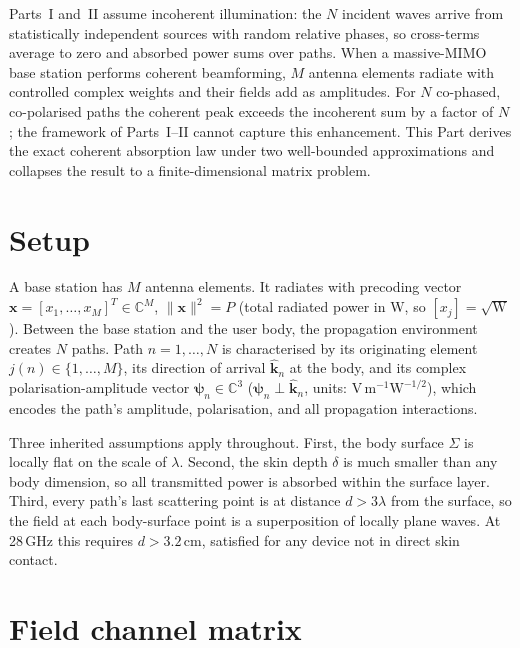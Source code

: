 \documentclass[11pt,a4paper]{article}
\theoremstyle{definition}      %
\begin{document}
Parts~I and~II assume incoherent illumination: the $N$ incident
waves arrive from statistically independent sources with random
relative phases, so cross-terms average to zero and absorbed power
sums over paths.  When a massive-MIMO base station performs coherent
beamforming, $M$ antenna elements radiate with controlled complex
weights and their fields add as amplitudes.  For $N$ co-phased,
co-polarised paths the coherent peak exceeds the incoherent sum by a
factor of $N$; the framework of Parts~I--II cannot capture this
enhancement.  This Part derives the exact coherent absorption law
under two well-bounded approximations and collapses the result to a
finite-dimensional matrix problem.

\section{Setup}\label{sec:coherent-setup}

A base station has $M$ antenna elements.  It radiates with
precoding vector $\mathbf{x} = [x_1, \ldots, x_M]^T \in
\mathbb{C}^M$, $\|\mathbf{x}\|^2 = P$ (total radiated power in W, so
$[x_j] = \sqrt{\text{W}}$).  Between the base station and the user
body, the propagation environment creates $N$ paths.  Path
$n = 1,\ldots,N$ is characterised by its originating element
$j(n) \in \{1,\ldots,M\}$, its direction of arrival
$\hat{\mathbf{k}}_n$ at the body, and its complex
polarisation-amplitude vector $\boldsymbol{\psi}_n \in \mathbb{C}^3$
($\boldsymbol{\psi}_n \perp \hat{\mathbf{k}}_n$, units:
$\text{V}\,\text{m}^{-1}\text{W}^{-1/2}$), which encodes the path's
amplitude, polarisation, and all propagation interactions.

Three inherited assumptions apply throughout.
First, the body surface $\Sigma$ is locally flat on the scale of
$\lambda$.
Second, the skin depth $\delta$ is much smaller than any body dimension,
so all transmitted power is absorbed within the surface layer.
Third, every path's last scattering point is at distance $d > 3\lambda$
from the surface, so the field at each body-surface point is a
superposition of locally plane waves.  At 28\,GHz this requires
$d > 3.2$\,cm, satisfied for any device not in direct skin contact.

\section{Field channel matrix}\label{sec:field-channel}
\end{document}
